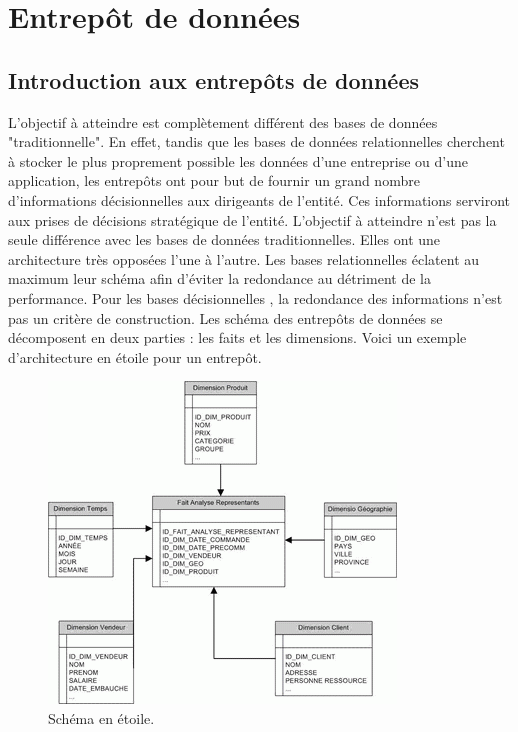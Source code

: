 \documentclass[a4paper,11pt]{report}
\begin{document}
\chapter{Entrepôt de données}

\section {Introduction aux entrepôts de données}

\normalsize{
L'objectif à atteindre est complètement  différent des bases de données "traditionnelle". En effet, tandis que les bases de données relationnelles cherchent à stocker le plus proprement possible les données d'une entreprise ou d'une application, les entrepôts ont pour but de fournir un grand nombre d'informations décisionnelles aux dirigeants de l'entité. Ces informations serviront aux prises de décisions stratégique de l'entité. L'objectif à atteindre n'est pas la seule différence avec les bases de données traditionnelles. Elles ont une architecture très opposées l'une à l'autre. Les bases relationnelles éclatent au maximum leur schéma afin d'éviter la redondance au détriment de la performance. Pour les bases décisionnelles , la redondance des informations n'est pas un critère de construction. Les schéma des entrepôts de données se décomposent en deux parties : les faits et les dimensions. Voici un exemple d'architecture en étoile pour un entrepôt.
} 

\begin{figure}[h]
   \begin{center}
   \includegraphics[scale =1.0]{etoile.png}
   \end{center}
  \caption{Schéma en étoile.}
\end{figure}
\end{document}
